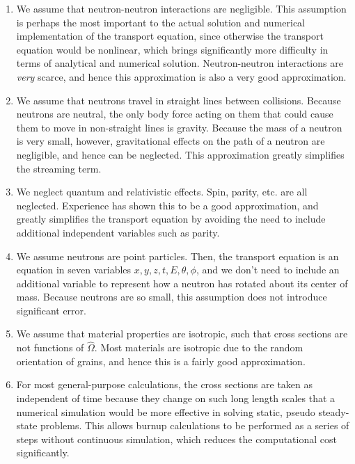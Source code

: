 \documentclass[10pt]{article}
\newcommand*\circled[1]{\tikz[baseline=(char.base)]{
            \node[shape=circle,draw,inner sep=2pt] (char) {#1};}}
\numberwithin{equation}{section} %
\begin{document}
\begin{enumerate}
\item We assume that neutron-neutron interactions are negligible. This assumption is perhaps the most important to the actual solution and numerical implementation of the transport equation, since otherwise the transport equation would be nonlinear, which brings significantly more difficulty in terms of analytical and numerical solution. Neutron-neutron interactions are \textit{very} scarce, and hence this approximation is also a very good approximation.
\item We assume that neutrons travel in straight lines between collisions. Because neutrons are neutral, the only body force acting on them that could cause them to move in non-straight lines is gravity. Because the mass of a neutron is very small, however, gravitational effects on the path of a neutron are negligible, and hence can be neglected. This approximation greatly simplifies the streaming term.
\item We neglect quantum and relativistic effects. Spin, parity, etc. are all neglected. Experience has shown this to be a good approximation, and greatly simplifies the transport equation by avoiding the need to include additional independent variables such as parity.
\item We assume neutrons are point particles. Then, the transport equation is an equation in seven variables \(x, y, z, t, E, \theta, \phi\), and we don't need to include an additional variable to represent how a neutron has rotated about its center of mass. Because neutrons are so small, this assumption does not introduce significant error.
\item We assume that material properties are isotropic, such that cross sections are not functions of \(\hat{\Omega}\). Most materials are isotropic due to the random orientation of grains, and hence this is a fairly good approximation.
\item For most general-purpose calculations, the cross sections are taken as independent of time because they change on such long length scales that a numerical simulation would be more effective in solving static, pseudo steady-state problems. This allows burnup calculations to be performed as a series of steps without continuous simulation, which reduces the computational cost significantly.
\end{enumerate}

\circled{8}\newline
\end{document}
